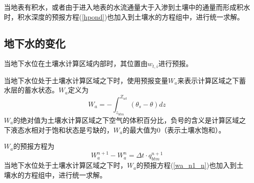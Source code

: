 当地表有积水，或者由于进入地表的水流通量大于入渗到土壤中的通量而形成积水时，积水深度的预报方程(\ref{hpond})也加入到土壤水的方程组中，进行统一求解。


\subsection{地下水的变化}
当地下水位在土壤水计算区域内部时，其位置由$w_{t,i}$进行预报。

当地下水位处于土壤水计算区域之下时，使用预报变量$W_a$来表示计算区域之下蓄水层的蓄水状态。$W_a$定义为
\begin{equation}
W_{a}=-\int_{z_{b t m}}^{Z_{w t}}\left(\theta_{s}-\theta\right) d z
\end{equation}
$W_a$的绝对值为土壤水计算区域之下空气的体积百分比，负号的含义是计算区域之下液态水相对于饱和状态是亏缺的，$W_a$的最大值为0（表示土壤水饱和）。


$W_a$的预报方程为
\begin{equation}\label{wa_n1_n}
W_{a}^{n+1}-W_{a}^{n}=\Delta t \cdot q_{b t m}^{n+1}
\end{equation}
当地下水位处于土壤水计算区域之下时，$W_a$的预报方程(\ref{wa_n1_n})也加入到土壤水的方程组中，进行统一求解。

